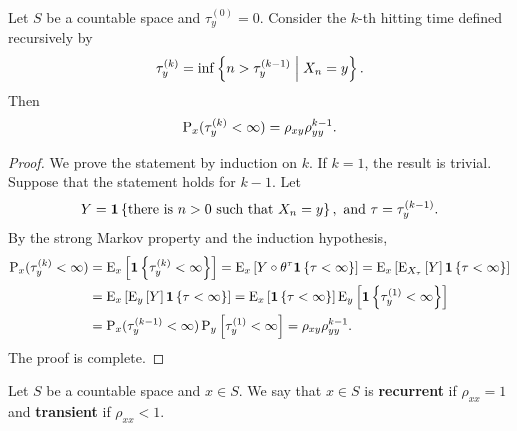\begin{theorem}\label{thm:multiple_hitting}
    Let $S$ be a countable space and $\tau^{(0)}_y = 0$. Consider the $k$-th hitting 
    time defined recursively by 
    \begin{equation*}
        \tau^{(k)}_y = \inf\Set{n>\tau^{(k-1)}_y}{X_n = y}.
    \end{equation*}
    Then 
    \begin{equation*}
        \P_x(\tau^{(k)}_y<\infty) = \rho_{xy}\rho_{yy}^{k-1}. 
    \end{equation*}
\end{theorem}
\begin{proof}
    We prove the statement by induction on $k$. If $k=1$, the result is trivial. 
    Suppose that the statement holds for $k-1$. Let 
    \begin{equation*}
        Y = \one\set{\text{there is }n>0\text{ such that $X_n = y$}},\text{ and }
        \tau = \tau_y^{(k-1)}. 
    \end{equation*} 
    By the strong Markov property and the induction hypothesis, 
    \begin{equation*}
        \begin{split}
            \P_x(\tau^{(k)}_y<\infty) &= \E_x\sbrc{\one\set{\tau^{(k)}_y<\infty}} 
            = \E_x\sbrc{Y\circ\theta^\tau\one\set{\tau<\infty}} 
            = \E_x\sbrc{\E_{X_\tau}\sbrc{Y}\one\set{\tau<\infty}} \\
            &= \E_x\sbrc{\E_y\sbrc{Y}\one\set{\tau<\infty}} 
            = \E_x\sbrc{\one\set{\tau<\infty}}\E_y\sbrc{\one\set{\tau^{(1)}_y<\infty}} \\
            &= \P_x(\tau^{(k-1)}_y<\infty)\P_y\sbrc{\tau^{(1)}_y<\infty} 
            = \rho_{xy}\rho_{yy}^{k-1}.
        \end{split}
    \end{equation*}
    The proof is complete. 
\end{proof}

\begin{definition}
    Let $S$ be a countable space and $x\in S$. We say that $x\in S$ is 
    \textbf{recurrent} if $\rho_{xx} = 1$ and \textbf{transient} if 
    $\rho_{xx}<1$.  
\end{definition}

